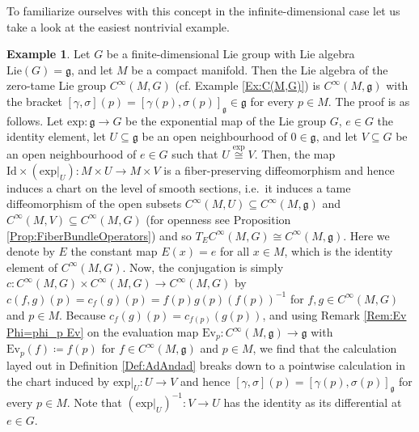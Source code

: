 \documentclass[12pt,a4paper]{article}
\theoremstyle{plain}
\theoremstyle{definition}
\newtheorem{example}[theorem]{Example}
\newcommand{\Id}{\mathrm{Id}}
\newcommand{\Ev}{\mathrm{Ev}}
\newcommand{\gfrak}{\mathfrak{g}}
\begin{document}
To familiarize ourselves with this concept in the infinite-dimensional case let us take a look at the easiest nontrivial example.
\begin{example}
Let $G$ be a finite-dimensional Lie group with Lie algebra $\mathrm{Lie}(G)=\gfrak$, and let $M$ be a compact manifold. Then the Lie algebra of the zero-tame Lie group $C^\infty(M,G)$ (cf. Example \ref{Ex:C(M,G)}) is $C^\infty(M,\gfrak)$ with the bracket $[\gamma,\sigma](p)=[\gamma(p),\sigma(p)]_{\gfrak}\in \gfrak$ for every $p\in M$.
The proof is as follows.
Let $\mathrm{exp}:\gfrak\to G$ be the exponential map of the Lie group $G$, $e\in G$ the identity element, let $U\subseteq \gfrak$ be an open neighbourhood of $0\in \gfrak$, and let $ V\subseteq G$ be an open neighbourhood of $e\in G$ such that $U\stackrel{\mathrm{exp}}{\cong}V$. Then, the map $\Id\times (\left.\mathrm{exp}\right|_U):M\times U\to M\times V$ is a fiber-preserving diffeomorphism and hence induces a chart on the level of smooth sections, i.e.~it induces a tame diffeomorphism of the open subsets $C^\infty(M,U)\subseteq C^\infty(M,\gfrak)$ and $C^\infty(M,V)\subseteq C^\infty(M,G)$ (for openness see Proposition \ref{Prop:FiberBundleOperators}) and so
$T_EC^\infty(M,G)\cong C^\infty(M,\gfrak)$. Here we denote by $E$ the constant map $E(x)= e$ for all $x\in M$, which is the identity element of $C^\infty(M,G)$.
Now, the conjugation is simply $c:C^\infty(M,G)\times C^\infty(M,G)\to C^\infty(M,G)$ by
$c(f,g)(p)=c_f(g)(p)=f(p)g(p)(f(p))^{-1}$ for $f,g\in C^\infty(M,G)$ and $p\in M$. Because $c_f(g)(p)=c_{f(p)}(g(p))$, and using Remark \ref{Rem:Ev Phi=phi_p Ev} on the evaluation map $\Ev_p:C^\infty(M,\gfrak)\to \gfrak$ with $\Ev_p(f)\coloneqq f(p)$ for $f\in C^\infty(M,\gfrak)$ and $p\in M$, we find that the calculation layed out in Definition \ref{Def:AdAndad}  breaks down to a pointwise calculation in the chart induced by $\left.\mathrm{exp}\right|_U:U\to V$ and hence $[\gamma,\sigma](p)=[\gamma(p),\sigma(p)]_{\gfrak}$ for every $p\in M$.
Note that $(\left.\mathrm{exp}\right|_U)^{-1}:V\to U$ has the identity as its differential at $e\in G$.
\end{example}

 
\end{document}

